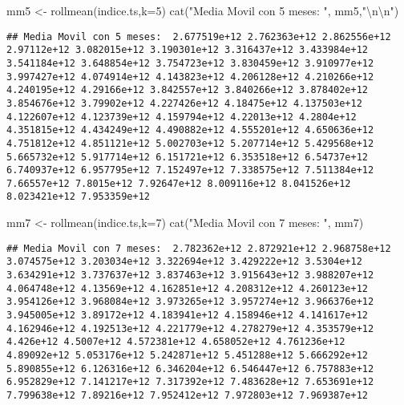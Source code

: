\documentclass[
]{book}
\newenvironment{Shaded}{\begin{snugshade}}{\end{snugshade}}
\newcommand{\AttributeTok}[1]{\textcolor[rgb]{0.77,0.63,0.00}{#1}}
\newcommand{\DecValTok}[1]{\textcolor[rgb]{0.00,0.00,0.81}{#1}}
\newcommand{\FunctionTok}[1]{\textcolor[rgb]{0.00,0.00,0.00}{#1}}
\newcommand{\NormalTok}[1]{#1}
\newcommand{\OtherTok}[1]{\textcolor[rgb]{0.56,0.35,0.01}{#1}}
\newcommand{\SpecialCharTok}[1]{\textcolor[rgb]{0.00,0.00,0.00}{#1}}
\newcommand{\StringTok}[1]{\textcolor[rgb]{0.31,0.60,0.02}{#1}}
\begin{document}
\begin{Shaded}
\begin{Highlighting}[]
\NormalTok{mm5 }\OtherTok{\textless{}{-}} \FunctionTok{rollmean}\NormalTok{(indice.ts,}\AttributeTok{k=}\DecValTok{5}\NormalTok{)}
\FunctionTok{cat}\NormalTok{(}\StringTok{"Media Movil con 5 meses: "}\NormalTok{, mm5,}\StringTok{"}\SpecialCharTok{\textbackslash{}n\textbackslash{}n}\StringTok{"}\NormalTok{)}
\end{Highlighting}
\end{Shaded}

\begin{verbatim}
## Media Movil con 5 meses:  2.677519e+12 2.762363e+12 2.862556e+12 2.97112e+12 3.082015e+12 3.190301e+12 3.316437e+12 3.433984e+12 3.541184e+12 3.648854e+12 3.754723e+12 3.830459e+12 3.910977e+12 3.997427e+12 4.074914e+12 4.143823e+12 4.206128e+12 4.210266e+12 4.240195e+12 4.29166e+12 3.842557e+12 3.840266e+12 3.878402e+12 3.854676e+12 3.79902e+12 4.227426e+12 4.18475e+12 4.137503e+12 4.122607e+12 4.123739e+12 4.159794e+12 4.22013e+12 4.2804e+12 4.351815e+12 4.434249e+12 4.490882e+12 4.555201e+12 4.650636e+12 4.751812e+12 4.851121e+12 5.002703e+12 5.207714e+12 5.429568e+12 5.665732e+12 5.917714e+12 6.151721e+12 6.353518e+12 6.54737e+12 6.740937e+12 6.957795e+12 7.152497e+12 7.338575e+12 7.511384e+12 7.66557e+12 7.8015e+12 7.92647e+12 8.009116e+12 8.041526e+12 8.023421e+12 7.953359e+12
\end{verbatim}

\begin{Shaded}
\begin{Highlighting}[]
\NormalTok{mm7 }\OtherTok{\textless{}{-}} \FunctionTok{rollmean}\NormalTok{(indice.ts,}\AttributeTok{k=}\DecValTok{7}\NormalTok{)}
\FunctionTok{cat}\NormalTok{(}\StringTok{"Media Movil con 7 meses: "}\NormalTok{, mm7)}
\end{Highlighting}
\end{Shaded}

\begin{verbatim}
## Media Movil con 7 meses:  2.782362e+12 2.872921e+12 2.968758e+12 3.074575e+12 3.203034e+12 3.322694e+12 3.429222e+12 3.5304e+12 3.634291e+12 3.737637e+12 3.837463e+12 3.915643e+12 3.988207e+12 4.064748e+12 4.13569e+12 4.162851e+12 4.208312e+12 4.260123e+12 3.954126e+12 3.968084e+12 3.973265e+12 3.957274e+12 3.966376e+12 3.945005e+12 3.89172e+12 4.183941e+12 4.158946e+12 4.141617e+12 4.162946e+12 4.192513e+12 4.221779e+12 4.278279e+12 4.353579e+12 4.426e+12 4.5007e+12 4.572381e+12 4.658052e+12 4.761236e+12 4.89092e+12 5.053176e+12 5.242871e+12 5.451288e+12 5.666292e+12 5.890855e+12 6.126316e+12 6.346204e+12 6.546447e+12 6.757883e+12 6.952829e+12 7.141217e+12 7.317392e+12 7.483628e+12 7.653691e+12 7.799638e+12 7.89216e+12 7.952412e+12 7.972803e+12 7.969387e+12
\end{verbatim}
\end{document}
